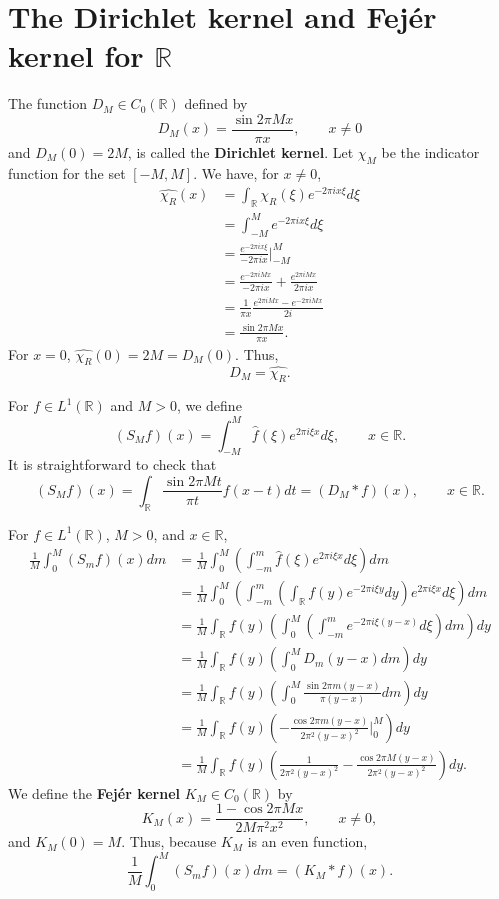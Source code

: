 \documentclass{article}
\theoremstyle{definition}
\begin{document}
\section{The Dirichlet kernel and Fej\'er kernel for $\mathbb{R}$}
The function $D_M \in C_0(\mathbb{R})$ defined by
\[
D_M(x)=\frac{\sin 2\pi Mx}{\pi x}, \qquad x \neq 0
\]
and $D_M(0)=2M$, is called the \textbf{Dirichlet kernel}.
Let $\chi_M$ be the indicator function for the set $[-M,M]$. We have, for $x \neq 0$,
\begin{align*}
\widehat{\chi_R}(x)& = \int_{\mathbb{R}} \chi_R(\xi) e^{-2\pi ix\xi} d\xi\\
&=\int_{-M}^M e^{-2\pi ix\xi} d\xi\\
&=\frac{e^{-2\pi ix\xi}}{-2\pi ix} \bigg|_{-M}^M\\
&=\frac{e^{-2\pi iMx}}{-2\pi ix} + \frac{e^{2\pi iMx}}{2\pi ix}\\
&=\frac{1}{\pi x} \frac{e^{2\pi iMx}-e^{-2\pi iMx}}{2i}\\
&=\frac{\sin 2\pi Mx}{\pi x}.
\end{align*}
For $x=0$, $\widehat{\chi_R}(0)=2M=D_M(0)$. Thus,
\[
D_M=\widehat{\chi_R}.
\]

For $f \in L^1(\mathbb{R})$ and $M>0$, we define
\[
(S_M f)(x) = \int_{-M}^M \hat{f}(\xi) e^{2\pi i\xi x} d\xi, \qquad x \in \mathbb{R}.
\]
It is straightforward to check that
\[
(S_M f)(x) = \int_{\mathbb{R}} \frac{\sin 2\pi Mt}{\pi t} f(x-t) dt
=(D_M*f)(x), \qquad x \in \mathbb{R}.
\]


For $f \in L^1(\mathbb{R})$, $M>0$, and $x \in \mathbb{R}$,
\begin{align*}
\frac{1}{M} \int_0^M (S_mf)(x) dm&=\frac{1}{M} \int_0^M \left( \int_{-m}^m \hat{f}(\xi) e^{2\pi i\xi x} d\xi \right) dm\\
&=\frac{1}{M}  \int_0^M \left( \int_{-m}^m \left( \int_{\mathbb{R}} f(y) e^{-2\pi i\xi y} dy \right) e^{2\pi i\xi x} d\xi \right) dm\\
&=\frac{1}{M} \int_{\mathbb{R}} f(y) \left( \int_0^M \left( \int_{-m}^m e^{-2\pi i\xi(y-x)} d\xi\right) dm \right) dy\\
&=\frac{1}{M} \int_{\mathbb{R}} f(y) \left( \int_0^M D_m(y-x) dm \right) dy\\
&=\frac{1}{M} \int_{\mathbb{R}} f(y)  \left( \int_0^M \frac{\sin 2\pi m(y-x)}{\pi(y-x)} dm \right) dy\\
&=\frac{1}{M} \int_{\mathbb{R}} f(y) \left( -\frac{\cos 2\pi m(y-x)}{2\pi^2 (y-x)^2} \bigg|_{0}^M \right) dy\\
&=\frac{1}{M} \int_{\mathbb{R}} f(y) \left(\frac{1}{2\pi^2(y-x)^2} - \frac{\cos 2\pi M(y-x)}{2\pi^2(y-x)^2} \right) dy.
\end{align*}
We define the \textbf{Fej\'er kernel} $K_M \in C_0(\mathbb{R})$ by
\[
K_M(x) = \frac{1-\cos 2\pi M x}{2M \pi^2 x^2}, \qquad x \neq 0,
\]
and $K_M(0)=M$. Thus, because $K_M$ is an even function,
\[
\frac{1}{M} \int_0^M (S_m f)(x) dm = (K_M*f)(x).
\]
\end{document}

